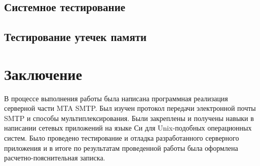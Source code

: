 \documentclass[a4paper,12pt]{report}
\begin{document}
\section{Системное тестирование}




\section{Тестирование утечек памяти}




\newpage
{}
\chapter*{Заключение}

В процессе выполнения работы была написана программная реализация серверной части MTA SMTP. Был изучен протокол передачи электронной почты SMTP и способы мультиплексирования. Были закреплены и получены навыки в написании сетевых приложений на языке Си для Unix-подобных операционных систем. Было проведено тестирование и отладка разработанного серверного приложения и в итоге по результатам проведенной работы была оформлена расчетно-пояснительная записка.
\end{document}
